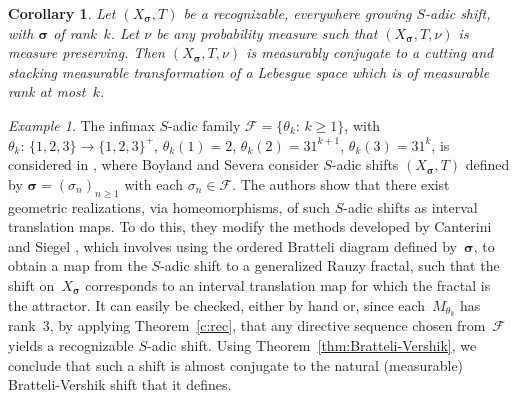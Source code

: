 \documentclass{amsart}
\newtheorem{corollary}[lemma]{Corollary}
\theoremstyle{definition}
\theoremstyle{remark}
\newtheorem{example}[lemma]{Example}
\numberwithin{equation}{section}
\begin{document}
\begin{corollary}
Let $(X_{\boldsymbol{\sigma}}, T)$ be a recognizable, everywhere growing $S$-adic shift, with
$\boldsymbol{\sigma}$ of rank~$k$.  
Let $\nu$ be any probability measure such that $(X_{\boldsymbol{\sigma}}, T,\nu)$ is measure preserving. 
Then $(X_{\boldsymbol{\sigma}}, T,\nu)$ is measurably conjugate to a cutting and stacking measurable transformation of a Lebesgue space which is of measurable rank at most~$k$.
\end{corollary}



\begin{example}
The infimax $S$-adic family $\mathcal{F} = \{\theta_k:\, k\geq 1\}$, with $\theta_k:\, \{1,2,3\} \to \{1,2,3\}^+$, $\theta_k(1)=2$, $\theta_k(2)=31^{k+1}$, $\theta_k(3)=31^k$, is considered in \cite{Boyland:2016}, where Boyland and Severa consider $S$-adic shifts $(X_{\boldsymbol{\sigma} },T)$ defined by $\boldsymbol{\sigma} = (\sigma_n)_{n\geq 1}$ with each $\sigma_n\in \mathcal{F}$.
The authors show that there exist geometric realizations, via homeomorphisms, of such  $S$-adic shifts as interval translation maps. 
To do this, they modify the methods developed by Canterini and Siegel \cite{CS01b,CanSie:2001}, which involves using the ordered Bratteli diagram defined by~$\boldsymbol{\sigma}$, to  obtain a map from the $S$-adic shift to a generalized Rauzy fractal, such that the shift on~$X_{\boldsymbol{\sigma}}$ corresponds to an interval translation map for which the fractal is the attractor. 
It can easily be checked, either by hand or, since each~$M_{\theta_k}$ has rank~3, by applying Theorem~\ref{c:rec}, that any directive sequence chosen from~$\mathcal{F}$ yields a recognizable $S$-adic shift. 
Using Theorem~\ref{thm:Bratteli-Vershik}, we conclude that such a shift is almost conjugate to the natural (measurable) Bratteli-Vershik shift that it defines.
\end{example}
\end{document}
